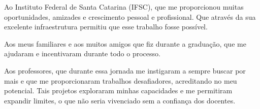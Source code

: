 \documentclass[
	12pt,				%
	openright,			%
	oneside,			%
	a4paper,			%
	chapter=TITLE,		%
	english,			%
	french,				%
	spanish,			%
	brazil				%
	]{abntex2}
\begin{document}
\frenchspacing 



\imprimircapa
\imprimirfolhaderosto* %

%

\cleardoublepage


\imprimiraprovacao
\cleardoublepage


\begin{agradecimentos}
    
    Ao Instituto Federal de Santa Catarina (IFSC), que me proporcionou muitas oportunidades, amizades e crescimento pessoal e profissional. Que através da sua excelente infraestrutura permitiu que esse trabalho fosse possível.
    
    Aos meus familiares e aos muitos amigos que fiz durante a graduação, que me ajudaram e incentivaram durante todo o processo. 
    
    Aos professores, que durante essa jornada me instigaram a sempre buscar por mais e que me proporcionaram trabalhos desafiadores, acreditando no meu potencial. Tais projetos exploraram minhas capacidades e me permitiram expandir limites, o que não seria vivenciado sem a confiança dos docentes.
    
    
\end{agradecimentos}
\end{document}
